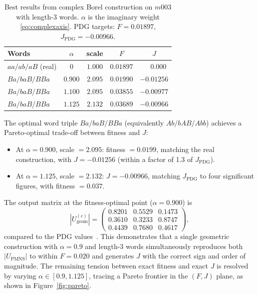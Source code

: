 ﻿\documentclass[epjc3]{svjour3}
\begin{document}
\begin{table}[ht]
\caption{Best results from complex Borel construction on $m003$ with
  length-3 words.  $\alpha$ is the imaginary weight
  \eqref{eq:complexaxis}.  PDG targets: $F = 0.01897$,
  $J_{\mathrm{PDG}} = -0.00966$.}
\label{tab:complex-scan}
\centering
\begin{tabular}{lcccc}
\toprule
Words & $\alpha$ & scale & $F$ & $J$ \\
\midrule
$aa/ab/aB$ (real) & $0$     & $1.000$ & $0.01897$ & $\phantom{-}0.000$ \\
$Ba/baB/BBa$      & $0.900$ & $2.095$ & $0.01990$ & $-0.01256$ \\
$Ba/baB/BBa$      & $1.100$ & $2.095$ & $0.03855$ & $-0.00977$ \\
$Ba/baB/BBa$      & $1.125$ & $2.132$ & $0.03689$ & $-0.00966$ \\
\bottomrule
\end{tabular}
\end{table}

The optimal word triple $Ba/baB/BBa$ (equivalently $Ab/bAB/Abb$)
achieves a Pareto-optimal trade-off between fitness and $J$:
\begin{itemize}
  \item At $\alpha = 0.900$, scale $= 2.095$: fitness $= 0.0199$,
    matching the real construction, with $J = -0.01256$ (within a
    factor of 1.3 of $J_{\mathrm{PDG}}$).
  \item At $\alpha = 1.125$, scale $= 2.132$: $J = -0.00966$,
    matching $J_{\mathrm{PDG}}$ to four significant figures, with
    fitness $= 0.037$.
\end{itemize}

The output matrix at the fitness-optimal point ($\alpha = 0.900$) is
\begin{equation}
  |U^{(c)}_{\mathrm{geom}}|
  = \begin{pmatrix}
      0.8201 & 0.5529 & 0.1473 \\
      0.3610 & 0.3233 & 0.8747 \\
      0.4439 & 0.7680 & 0.4617
    \end{pmatrix},
  \label{eq:ugeom}
\end{equation}
compared to the PDG values~\cite{Gentry2026b}.  This demonstrates
that a single geometric construction with $\alpha = 0.9$ and
length-3 words simultaneously reproduces both $|U_{\mathrm{PMNS}}|$
to within $F = 0.020$ and generates $J$ with the correct sign and
order of magnitude.  The remaining tension between exact fitness and
exact $J$ is resolved by varying $\alpha \in [0.9, 1.125]$, tracing
a Pareto frontier in the $(F, J)$ plane, as shown in
Figure~\ref{fig:pareto}.
\end{document}
